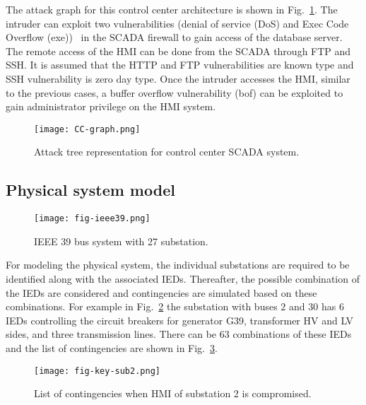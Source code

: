 The attack graph for this control center architecture is shown in Fig.~\ref{fig:graph-CC}. The intruder can exploit two vulnerabilities (denial of service (DoS) and Exec Code Overflow (exe))~\cite{ssh} in the SCADA firewall to gain access of the database server. The remote access of the HMI can be done from the SCADA through FTP and SSH. It is assumed that the HTTP and FTP vulnerabilities are known type and SSH vulnerability is zero day type. Once the intruder accesses the HMI, similar to the previous cases, a buffer overflow vulnerability (bof) can be exploited to gain administrator privilege on the HMI system.
\begin{figure}[htbp]
	\centering
	\texttt{[image: CC-graph.png]}
	\caption{Attack tree representation for control center SCADA system.}
	\label{fig:graph-CC}
\end{figure}
\subsection{Physical system model}\label{sec:physical}
\begin{figure}[htbp]
	\centering
	\texttt{[image: fig-ieee39.png]}
	\caption{IEEE 39 bus system with 27 substation.}
	\label{fig:ieee39}
\end{figure}
For modeling the physical system, the individual substations are required to be identified along with the associated IEDs. Thereafter, the possible combination of the IEDs are considered and contingencies are simulated based on these combinations. For example in Fig.~\ref{fig:ieee39} the substation with buses $2$ and $30$ has $6$ IEDs controlling the circuit breakers for generator G39, transformer HV and LV sides, and three transmission lines. There can be 63 combinations of these IEDs and the list of contingencies are shown in Fig.~\ref{fig:keysub2}.
\begin{figure}[htbp]
	\centering
	\texttt{[image: fig-key-sub2.png]}
	\caption{List of contingencies when HMI of substation 2 is compromised.}
	\label{fig:keysub2}
\end{figure}

